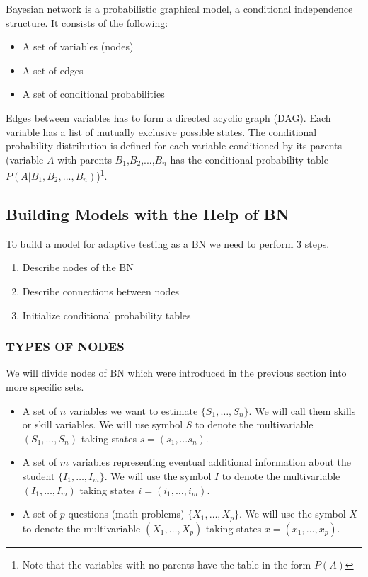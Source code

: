 Bayesian network is a probabilistic graphical model, a conditional independence structure. It consists of the following: 
\begin{itemize}
	\item A set of variables (nodes)
	\item A set of edges
	\item A set of conditional probabilities
\end{itemize}
Edges between variables has to form a directed acyclic graph (DAG). Each variable has a list of mutually exclusive possible states. The conditional probability distribution is defined for each variable conditioned by its parents (variable $A$ with parents $B_1$,$B_2$,...,$B_n$ has the conditional probability table ${P(A|B_1,B_2,...,B_n)}$)\footnote{Note that the variables with no parents have the table in the form $P(A)$}. 

\subsection{Building Models with the Help of BN}
To build a model for adaptive testing as a BN we need to perform 3 steps.
\begin{enumerate}
	\item Describe nodes of the BN
	\item Describe connections between nodes
	\item Initialize conditional probability tables
\end{enumerate}
 
\subsubsection{TYPES OF NODES}
We will divide nodes of BN which were introduced in the previous section into more specific sets. 
\begin{itemize} 
\item A set of $n$ variables we want to estimate $\{S_1,\ldots,S_n\}$. 
We will call them skills or skill variables. We will use symbol $S$ to denote the multivariable $(S_1,\ldots,S_n)$ taking states $s = (s_1,\ldots s_n)$. 
\item A set of $m$ variables representing eventual additional information about the student $\{I_1,\ldots,I_m\}$.  
We will use the symbol $I$ to denote the multivariable $(I_1,\ldots,I_m)$ taking states $i = (i_1,\ldots,i_m)$.
\item A set of $p$ questions (math problems) $\{X_1,\ldots,X_p\}$.  
We will use the symbol $X$ to denote the multivariable $(X_1,\ldots,X_p)$ taking states $x = (x_1,\ldots,x_p)$.
\end{itemize}

